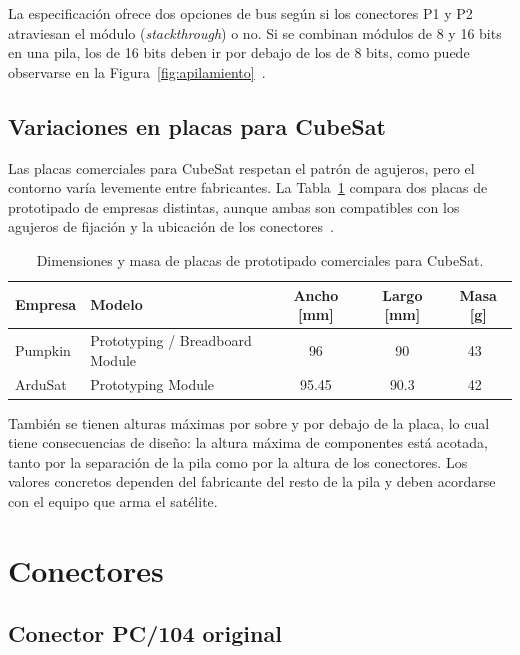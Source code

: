 La especificación ofrece dos opciones de bus según si los conectores P1 y P2 atraviesan el módulo (\emph{stackthrough}) o no. Si se combinan módulos de 8 y 16 bits en una pila, los de 16 bits deben ir por debajo de los de 8 bits, como puede observarse en la Figura~\ref{fig:apilamiento}~\cite[Sec.~2.2]{pc104v24}.

\subsection{Variaciones en placas para CubeSat}\label{subsec:pc104-variaciones}

Las placas comerciales para CubeSat respetan el patrón de agujeros, pero el contorno varía levemente entre fabricantes. La Tabla~\ref{tab:ejemplos} compara dos placas de prototipado de empresas distintas, aunque ambas son compatibles con los agujeros de fijación y la ubicación de los conectores~\cite{pumpkinprotoboard,ardusat}.

\begin{table}[H]
  \centering
  \begin{tabular}{@{}llccc@{}}
    \toprule
    Empresa & Modelo & Ancho [\si{\milli\metre}] & Largo [\si{\milli\metre}] & Masa [\si{\gram}] \\
    \midrule
    Pumpkin & Prototyping / Breadboard Module & \num{96} & \num{90} & \num{43}~\cite{pumpkinprotoboard} \\
    ArduSat & Prototyping Module & \num{95,45} & \num{90,3} & \num{42}~\cite{ardusat} \\
    \bottomrule
  \end{tabular}
  \caption[Dimensiones y masa de placas de prototipado]{Dimensiones y masa de placas de prototipado comerciales para CubeSat.}\label{tab:ejemplos}
\end{table}

También se tienen alturas máximas por sobre y por debajo de la placa, lo cual tiene consecuencias de diseño: la altura máxima de componentes está acotada, tanto por la separación de la pila como por la altura de los conectores. Los valores concretos dependen del fabricante del resto de la pila y deben acordarse con el equipo que arma el satélite.

\section{Conectores}\label{sec:pc104-conectores}

\subsection{Conector PC/104 original}\label{subsec:pc104-conector-orig}

